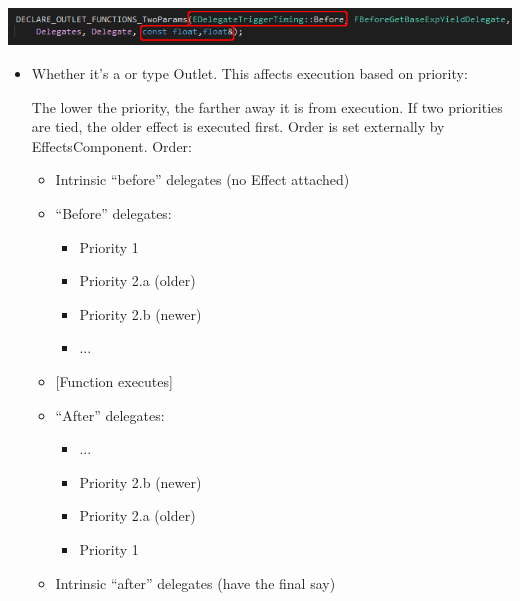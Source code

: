 \begin{enumerate}
{	\begin{center}
		\includegraphics[scale=\ScreenshotScale]{create-outlet-functions}
	\end{center}
		\begin{itemize}
			\item{Whether it's a  or  type Outlet. This affects execution based on priority:
			\begin{tcolorbox}[colback=gray!20!white,colframe=blue!75!black,title=Priorities]
			
				The lower the priority, the farther away it is from execution. If two priorities are tied, the older effect is executed first. Order is set externally by EffectsComponent. Order:\\
				\begin{itemize}
					\item{Intrinsic ``before'' delegates (no Effect attached)}
					\item{``Before'' delegates:
						\begin{itemize}
							\item{Priority 1}
							\item{Priority 2.a (older)}
							\item{Priority 2.b (newer)}
							\item{...}
						\end{itemize}
						}
					\item{[Function executes]}
					\item{``After'' delegates:
						\begin{itemize}
							\item{...}
							\item{Priority 2.b (newer)}
							\item{Priority 2.a (older)}
							\item{Priority 1}
						\end{itemize}
						}
					\item{Intrinsic ``after'' delegates (have the final say)}
				\end{itemize}
				

\end{tcolorbox}}
\end{itemize}}
\end{enumerate}
